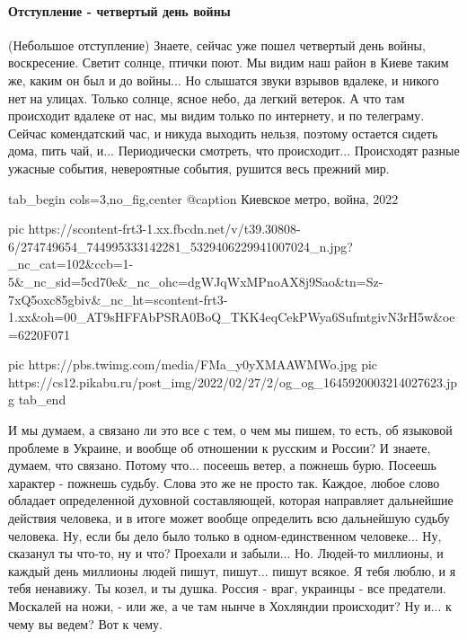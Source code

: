  
 
 
 
 

\paragraph{Отступление - четвертый день войны}
\label{sec:moje.kremlevskie_narrativy.jazyk.otstuplenie_4_den_vojny}

(Небольшое отступление) Знаете, сейчас уже пошел четвертый день войны,
воскресение. Светит солнце, птички поют. Мы видим наш район в Киеве таким же,
каким он был и до войны...  Но слышатся звуки взрывов вдалеке, и никого нет на
улицах. Только солнце, ясное небо, да легкий ветерок.  А что там происходит
вдалеке от нас, мы видим только по интернету, и по телеграму.  Сейчас
комендатский час, и никуда выходить нельзя, поэтому остается сидеть дома, пить
чай, и...  Периодически смотреть, что происходит...  Происходят разные ужасные
события, невероятные события, рушится весь прежний мир. 

\ifcmt
  tab_begin cols=3,no_fig,center
		 @caption Киевское метро, война, 2022

     pic https://scontent-frt3-1.xx.fbcdn.net/v/t39.30808-6/274749654_744995333142281_5329406229941007024_n.jpg?_nc_cat=102&ccb=1-5&_nc_sid=5cd70e&_nc_ohc=dgWJqWxMPnoAX8j9Sao&tn=Sz-7xQ5oxc85gbiv&_nc_ht=scontent-frt3-1.xx&oh=00_AT9sHFFAbPSRA0BoQ_TKK4eqCekPWya6SufmtgivN3rH5w&oe=6220F071

		 pic https://pbs.twimg.com/media/FMa_y0yXMAAWMWo.jpg
		 pic https://cs12.pikabu.ru/post_img/2022/02/27/2/og_og_1645920003214027623.jpg
  tab_end
\fi

И мы думаем, а связано ли это все с тем, о чем мы
пишем, то есть, об языковой проблеме в Украине, и вообще об отношении к русским
и России? И знаете, думаем, что связано. Потому что...  посеешь ветер, а
пожнешь бурю. Посеешь характер - пожнешь судьбу. Слова это же не просто так.
Каждое, любое слово обладает определенной духовной составляющей, которая
направляет дальнейшие действия человека, и в итоге может вообще определить всю
дальнейшую судьбу человека. Ну, если бы дело было только в одном-единственном
человеке... Ну, сказанул ты что-то, ну и что? Проехали и забыли... Но. Людей-то
миллионы, и каждый день миллионы людей пишут, пишут...  пишут всякое. Я тебя
люблю, и я тебя ненавижу.  Ты козел, и ты душка. Россия - враг, украинцы - все
предатели. Москалей на ножи, - или же, а че там нынче в Хохляндии происходит?
Ну и... к чему вы ведем? Вот к чему. 


